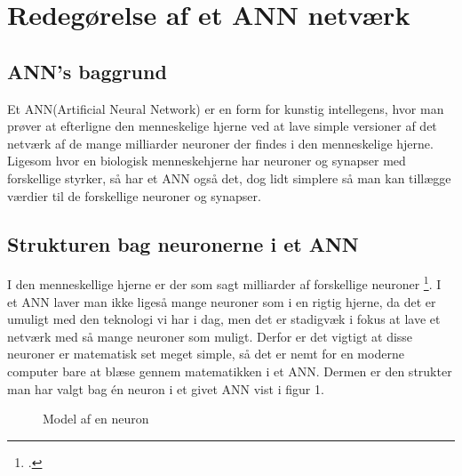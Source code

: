 \section{Redegørelse af et ANN netværk}

\subsection{ANN's baggrund}
Et ANN(Artificial Neural Network) er en form for kunstig intellegens, hvor man prøver at efterligne den menneskelige hjerne
ved at lave simple versioner af det netværk af de mange milliarder neuroner der findes i den menneskelige hjerne.
Ligesom hvor en biologisk menneskehjerne har neuroner og synapser med forskellige styrker, så har et ANN også det, dog lidt simplere
så man kan tillægge værdier til de forskellige neuroner og synapser.

\subsection{Strukturen bag neuronerne i et ANN}
I den menneskellige hjerne er der som sagt milliarder af forskellige neuroner \footcite{DDOhjerne}.
I et ANN laver man ikke ligeså mange
neuroner som i en rigtig hjerne, da det er umuligt med den teknologi vi har i dag, men det er stadigvæk i fokus at lave et netværk med så mange neuroner
som muligt.
Derfor er det vigtigt at disse neuroner er matematisk set meget simple, så det er nemt for en moderne computer bare at blæse gennem matematikken
i et ANN. Dermen er den strukter man har valgt bag én neuron i et givet ANN vist i figur 1.

\begin{figure}
\label{neuron}
\caption{Model af en neuron}

\end{figure}

